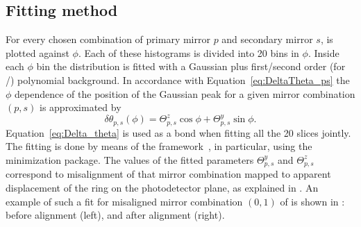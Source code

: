 \subsection{Fitting method}
\label{subsec:Fitting}

For every chosen combination of primary mirror $p$ and secondary mirror $s$,
\deltatheta is plotted against $\phi$. Each of these histograms is divided into
20 bins in $\phi$. Inside each $\phi$ bin the \deltatheta distribution is fitted
with a Gaussian plus first/second order (for \richone/\richtwo) polynomial
background. In accordance with Equation~\ref{eq:DeltaTheta_ps} the $\phi$
dependence of the position of the Gaussian peak for a given mirror combination
$(p,s)$ is approximated by
\begin{equation}
  \label{eq:Delta_theta}
  \delta\theta_{p,s}(\phi) = \varTheta^z_{p,s}\cos\phi
                           + \varTheta^y_{p,s}\sin\phi.
\end{equation}
Equation~\ref{eq:Delta_theta} is used as a bond when fitting all the 20 slices
jointly. The fitting is done by means of the \root
framework~\cite{Antcheva:2011zz}, in particular, using the  minimization
package. The values of the fitted parameters $\varTheta^y_{p,s}$ and
$\varTheta^z_{p,s}$ correspond to misalignment of that mirror combination mapped
to apparent displacement of the ring on the photodetector plane, as explained in
. An example of such a fit for misaligned
mirror combination $(0,1)$ of \richone is shown in
: before alignment (left), and after
alignment (right).
